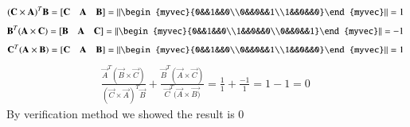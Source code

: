 \documentclass[journal]{IEEEtran}
\begin{document}
\begin{align}
(\vec{C} \times \vec{A})^T\vec{B}=[\vec{C}\quad\vec{A}\quad\vec{B}]=\left\|\begin{myvec}{0&&1&&0\\0&&0&&1\\1&&0&&0}\end{myvec}\right\|=1\
\end{align}
\begin{align}
\vec{B}^T(\vec{A}\times \vec{C})=[\vec{B}\quad\vec{A}\quad\vec{C}]=\left\|\begin{myvec}{0&&1&&0\\1&&0&&0\\0&&0&&1}\end{myvec}\right\|=-1\
\end{align}
\begin{align}
\vec{C}^T (\vec{A} \times \vec{B})=[\vec{C}\quad\vec{A}\quad\vec{B}]=\left\|\begin{myvec}{0&&1&&0\\0&&0&&1\\1&&0&&0}\end{myvec}\right\|=1\ 
\end{align}
\begin{align}
\frac{\vec{A}^T(\vec{B}\times\vec{C})}{(\vec{C} \times \vec{A})^T \vec{B}}
+ \frac{\vec{B}^T(\vec{A}\times \vec{C})}{\vec{C}^T (\vec{A} \times \vec{B)}}
= \frac{1}{1}+\frac{-1}{1}=1-1=0\
\end{align}
By verification method we showed the result is 0
\end{document}
